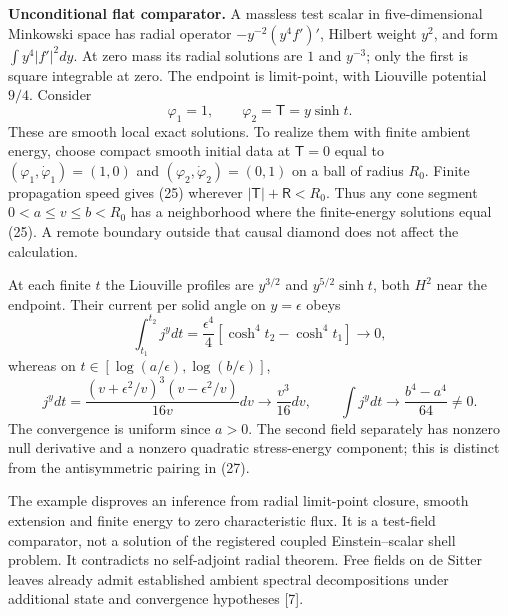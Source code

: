 \documentclass[
  11pt,
]{article}
\begin{document}
\textbf{Unconditional flat comparator.} A massless test scalar in
five-dimensional Minkowski space has radial operator
\(-y^{-2}(y^4 f')'\), Hilbert weight \(y^2\), and form
\(\int y^4|f'|^2dy\). At zero mass its radial solutions are \(1\) and
\(y^{-3}\); only the first is square integrable at zero. The endpoint is
limit-point, with Liouville potential \(9/4\). Consider \[
 \varphi_1=1,\qquad \varphi_2=\mathsf T=y\sinh t.       \tag{25}
\] These are smooth local exact solutions. To realize them with finite
ambient energy, choose compact smooth initial data at \(\mathsf T=0\)
equal to \((\varphi_1,\dot\varphi_1)=(1,0)\) and
\((\varphi_2,\dot\varphi_2)=(0,1)\) on a ball of radius \(R_0\). Finite
propagation speed gives (25) wherever \(|\mathsf T|+\mathsf R<R_0\).
Thus any cone segment \(0<a\le v\le b<R_0\) has a neighborhood where the
finite-energy solutions equal (25). A remote boundary outside that
causal diamond does not affect the calculation.

At each finite \(t\) the Liouville profiles are \(y^{3/2}\) and
\(y^{5/2}\sinh t\), both \(H^2\) near the endpoint. Their current per
solid angle on \(y=\epsilon\) obeys \[
 \int_{t_1}^{t_2}\!j^y dt
 =\frac{\epsilon^4}{4}[\cosh^4t_2-\cosh^4t_1]\longrightarrow0,
                                                               \tag{26}
\] whereas on \(t\in[\log(a/\epsilon),\log(b/\epsilon)]\), \[
 j^y dt=\frac{(v+\epsilon^2/v)^3(v-\epsilon^2/v)}{16v}dv
 \longrightarrow\frac{v^3}{16}dv,\qquad
 \int j^y dt\longrightarrow\frac{b^4-a^4}{64}\ne0.     \tag{27}
\] The convergence is uniform since \(a>0\). The second field separately
has nonzero null derivative and a nonzero quadratic stress-energy
component; this is distinct from the antisymmetric pairing in (27).

The example disproves an inference from radial limit-point closure,
smooth extension and finite energy to zero characteristic flux. It is a
test-field comparator, not a solution of the registered coupled
Einstein--scalar shell problem. It contradicts no self-adjoint radial
theorem. Free fields on de Sitter leaves already admit established
ambient spectral decompositions under additional state and convergence
hypotheses {[}7{]}.
\end{document}
